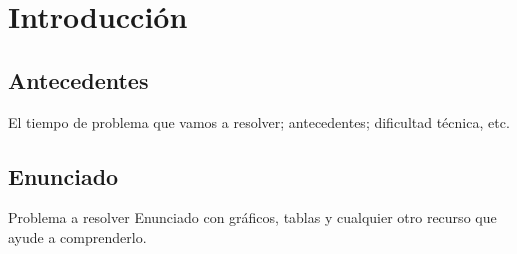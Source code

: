 
\section{Introducción}
\subsection{Antecedentes}
El tiempo de problema que vamos a resolver; antecedentes; dificultad técnica, etc.
\cite{overleafwebsite}
\subsection{Enunciado}
Problema a resolver
Enunciado con gráficos, tablas y cualquier otro recurso que ayude a comprenderlo.